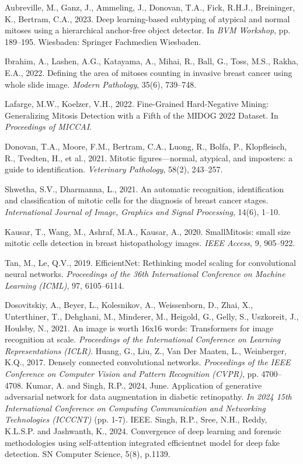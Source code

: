 \documentclass[conference]{IEEEtran}
\begin{document}
\begin{thebibliography}{}
Aubreville, M., Ganz, J., Ammeling, J., Donovan, T.A., Fick, R.H.J., Breininger, K., Bertram, C.A., 2023. Deep learning-based subtyping of atypical and normal mitoses using a hierarchical anchor-free object detector. In \textit{BVM Workshop}, pp. 189–195. Wiesbaden: Springer Fachmedien Wiesbaden.

Ibrahim, A., Lashen, A.G., Katayama, A., Mihai, R., Ball, G., Toss, M.S., Rakha, E.A., 2022. Defining the area of mitoses counting in invasive breast cancer using whole slide image. \textit{Modern Pathology}, 35(6), 739–748.

Lafarge, M.W., Koelzer, V.H., 2022. Fine-Grained Hard-Negative Mining: Generalizing Mitosis Detection with a Fifth of the MIDOG 2022 Dataset. In \textit{Proceedings of MICCAI}.


Donovan, T.A., Moore, F.M., Bertram, C.A., Luong, R., Bolfa, P., Klopfleisch, R., Tvedten, H., et al., 2021. Mitotic figures—normal, atypical, and imposters: a guide to identification. \textit{Veterinary Pathology}, 58(2), 243–257.

Shwetha, S.V., Dharmanna, L., 2021. An automatic recognition, identification and classification of mitotic cells for the diagnosis of breast cancer stages. \textit{International Journal of Image, Graphics and Signal Processing}, 14(6), 1–10.

Kausar, T., Wang, M., Ashraf, M.A., Kausar, A., 2020. SmallMitosis: small size mitotic cells detection in breast histopathology images. \textit{IEEE Access}, 9, 905–922.

Tan, M., Le, Q.V., 2019. EfficientNet: Rethinking model scaling for convolutional neural networks. \textit{Proceedings of the 36th International Conference on Machine Learning (ICML)}, 97, 6105--6114.

Dosovitskiy, A., Beyer, L., Kolesnikov, A., Weissenborn, D., Zhai, X., Unterthiner, T., Dehghani, M., Minderer, M., Heigold, G., Gelly, S., Uszkoreit, J., Houlsby, N., 2021. An image is worth 16x16 words: Transformers for image recognition at scale. \textit{Proceedings of the International Conference on Learning Representations (ICLR)}.
Huang, G., Liu, Z., Van Der Maaten, L., Weinberger, K.Q., 2017. Densely connected convolutional networks. \textit{Proceedings of the IEEE Conference on Computer Vision and Pattern Recognition (CVPR)}, pp. 4700--4708.
Kumar, A. and Singh, R.P., 2024, June. Application of generative adversarial network for data augmentation in diabetic retinopathy. \textit{In 2024 15th International Conference on Computing Communication and Networking Technologies (ICCCNT)} (pp. 1-7). IEEE.
 Singh, R.P., Sree, N.H., Reddy, K.L.S.P. and Jashwanth, K., 2024. Convergence of deep learning and forensic methodologies using self-attention integrated efficientnet model for deep fake detection. SN Computer Science, 5(8), p.1139.


\end{thebibliography}
\end{document}
